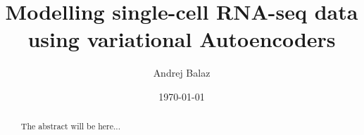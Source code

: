 \documentclass[10pt,a4paper]{report}
\begin{document}
\title{Modelling single-cell RNA-seq data using variational Autoencoders}
\author{Andrej Balaz}
\date{\today}
\maketitle

\begin{abstract}
The abstract will be here...
\end{abstract}

\tableofcontents
\newpage








 
\end{document}
